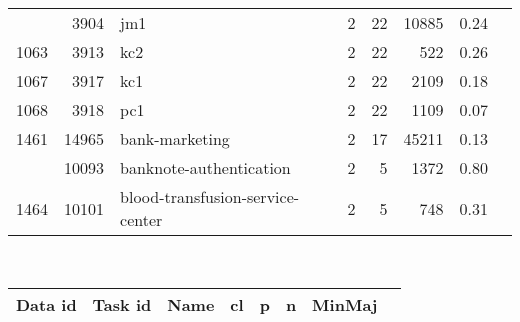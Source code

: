 \documentclass[twoside,11pt]{article}
\begin{document}
\begin{table}[h]
\begin{adjustbox}{center, width=7.75cm, totalheight=12cm}
\begin{tabular}{rrlrrrrr}
\addlinespace
1053 & 3904 & jm1 & 2 & 22 & 10885 & 0.24\\
1063 & 3913 & kc2 & 2 & 22 & 522 & 0.26\\
1067 & 3917 & kc1 & 2 & 22 & 2109 & 0.18\\
1068 & 3918 & pc1 & 2 & 22 & 1109 & 0.07\\
1461 & 14965 & bank-marketing & 2 & 17 & 45211 & 0.13\\
\addlinespace
1462 & 10093 & banknote-authentication & 2 & 5 & 1372 & 0.80\\
1464 & 10101 & blood-transfusion-service-center & 2 & 5 & 748 & 0.31\\










\bottomrule
\end{tabular}
~~~~~
\begin{tabular}{rrlrrrrr}
\toprule
\textbf{ Data id } & \textbf{ Task id } & \textbf{ Name } &  \textbf{ cl } & \textbf{ p } & \textbf{ n } & \textbf{MinMaj}\\
\midrule 


\end{tabular}
\end{adjustbox}
\end{table}
\end{document}
